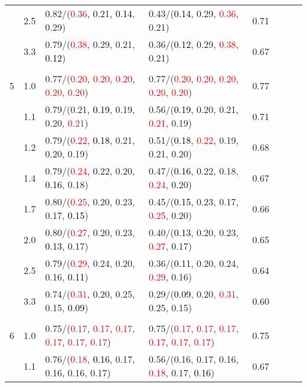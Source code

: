 \documentclass[10pt,a4paper]{report}
\begin{document}
\begin{table}[!htbp]
\begin{center}
{\begin{tabular}{ccllcccc}
			&2.5&0.82/(\textcolor{red}{0.36}, 0.21, \textcolor{black}{0.14}, 0.29)&0.43/(\textcolor{black}{0.14}, 0.29, \textcolor{red}{0.36}, 0.21)&0.71\\
			&3.3&0.79/(\textcolor{red}{0.38}, 0.29, 0.21, \textcolor{black}{0.12})&0.36/(\textcolor{black}{0.12}, 0.29, \textcolor{red}{0.38}, 0.21)&0.67\\
			&&&&\\
			5			&1.0&0.77/(\textcolor{red}{0.20}, \textcolor{red}{0.20}, \textcolor{red}{0.20}, \textcolor{red}{0.20}, \textcolor{red}{0.20})&0.77/(\textcolor{red}{0.20}, \textcolor{red}{0.20}, \textcolor{red}{0.20}, \textcolor{red}{0.20}, \textcolor{red}{0.20})&0.77\\
			&1.1&0.79/(0.21, \textcolor{black}{0.19}, 0.19, 0.20, \textcolor{red}{0.21})&0.56/(\textcolor{black}{0.19}, 0.20, 0.21, \textcolor{red}{0.21}, 0.19)&0.71\\
			&1.2&0.79/(\textcolor{red}{0.22}, \textcolor{black}{0.18}, 0.21, 0.20, 0.19)&0.51/(\textcolor{black}{0.18}, \textcolor{red}{0.22}, 0.19, 0.21, 0.20)&0.68\\
			&1.4&0.79/(\textcolor{red}{0.24}, 0.22, 0.20, \textcolor{black}{0.16}, 0.18)&0.47/(\textcolor{black}{0.16}, 0.22, 0.18, \textcolor{red}{0.24}, 0.20)&0.67\\
			&1.7&0.80/(\textcolor{red}{0.25}, 0.20, 0.23, 0.17, \textcolor{black}{0.15})&0.45/(\textcolor{black}{0.15}, 0.23, 0.17, \textcolor{red}{0.25}, 0.20)&0.66\\
			&2.0&0.80/(\textcolor{red}{0.27}, 0.20, 0.23, \textcolor{black}{0.13}, 0.17)&0.40/(\textcolor{black}{0.13}, 0.20, 0.23, \textcolor{red}{0.27}, 0.17)&0.65\\
			&2.5&0.79/(\textcolor{red}{0.29}, 0.24, 0.20, 0.16, \textcolor{black}{0.11})&0.36/(\textcolor{black}{0.11}, 0.20, 0.24, \textcolor{red}{0.29}, 0.16)&0.64\\
			&3.3&0.74/(\textcolor{red}{0.31}, 0.20, 0.25, 0.15, \textcolor{black}{0.09})&0.29/(\textcolor{black}{0.09}, 0.20, \textcolor{red}{0.31}, 0.25, 0.15)&0.60\\
			&&&&\\
			6			&1.0&0.75/(\textcolor{red}{0.17}, \textcolor{red}{0.17}, \textcolor{red}{0.17}, \textcolor{red}{0.17}, \textcolor{red}{0.17}, \textcolor{red}{0.17})&0.75/(\textcolor{red}{0.17}, \textcolor{red}{0.17}, \textcolor{red}{0.17}, \textcolor{red}{0.17}, \textcolor{red}{0.17}, \textcolor{red}{0.17})&0.75\\
			&1.1&0.76/(\textcolor{red}{0.18}, \textcolor{black}{0.16}, 0.17, 0.16, 0.16, 0.17)&0.56/(0.16, 0.17, 0.16, \textcolor{red}{0.18}, 0.17, \textcolor{black}{0.16})&0.67\\

\end{tabular}}
\end{center}
\end{table}
\end{document}
